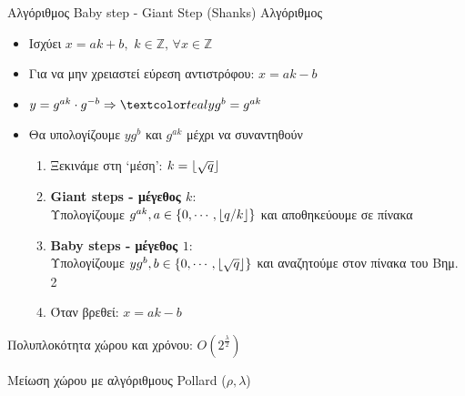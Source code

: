 \documentclass[handout]{beamer}
\DeclarePairedDelimiter\floor{\lfloor}{\rfloor}
\begin{document}
\begin{frame}{Αλγόριθμος Baby step - Giant Step (Shanks)}
Αλγόριθμος 
\begin{itemize}
\item Ισχύει $x = ak+b, \, \,  k \in \mathbb{Z}, \, \forall x \in \mathbb{Z}$ 
\item Για να μην χρειαστεί εύρεση αντιστρόφου: $x = ak-b$
\pause
\item $y=g^{ak} \cdot g^{-b} \Rightarrow \green{{y}{g^b}=g^{ak}}$
\pause
\item Θα υπολογίζουμε $yg^b$ και $g^{ak}$ μέχρι να συναντηθούν
\pause
\begin{enumerate}
\item Ξεκινάμε στη `μέση': $k = \floor{\sqrt{q}}$\pause
\item \textbf{Giant steps - μέγεθος $k$}:\\ Υπολογίζουμε ${g^{ak}}, a \in \{0, \cdots, \floor{q/k} \}$ και αποθηκεύουμε σε πίνακα \pause
\item \textbf{Baby steps - μέγεθος $1$}: \\Υπολογίζουμε $yg^b, b \in \{0, \cdots, \floor{\sqrt{q}} \}$  και αναζητούμε στον πίνακα του Βημ. 2 \pause
\item Όταν βρεθεί: $x = ak-b$
\end{enumerate}
\end{itemize}
Πολυπλοκότητα χώρου και χρόνου: $O(2^\frac{\lambda}{2})$

Μείωση χώρου με αλγόριθμους Pollard ($\rho, \lambda$)
\end{frame}
\end{document}
